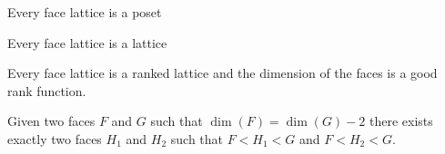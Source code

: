 \begin{proposition}
  Every face lattice is a poset
\end{proposition}

\begin{proposition}
  Every face lattice is a lattice
\end{proposition}

\begin{proposition}
  Every face lattice is a ranked lattice and the dimension of the faces is a good rank function.
\end{proposition}

\begin{proposition}
  Given two faces $F$ and $G$ such that $\dim(F) = \dim(G) - 2$ there exists exactly two faces $H_1$ and $H_2$ such that $F < H_1 < G$ and $F < H_2 < G$.
\end{proposition}
